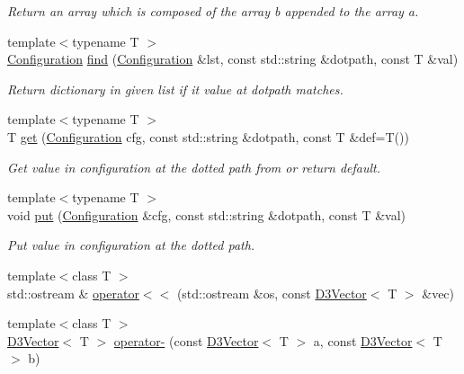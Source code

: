 \begin{DoxyCompactItemize}
\begin{DoxyCompactList}\small\item\em Return an array which is composed of the array b appended to the array a. \end{DoxyCompactList}\item 
{\footnotesize template$<$typename T $>$ }\\\hyperlink{namespace_wire_cell_a9f705541fc1d46c608b3d32c182333ee}{Configuration} \hyperlink{namespace_wire_cell_aeda39bc129b6bab40d0e35ffb4af55ef}{find} (\hyperlink{namespace_wire_cell_a9f705541fc1d46c608b3d32c182333ee}{Configuration} \&lst, const std\+::string \&dotpath, const T \&val)
\begin{DoxyCompactList}\small\item\em Return dictionary in given list if it value at dotpath matches. \end{DoxyCompactList}\item 
{\footnotesize template$<$typename T $>$ }\\T \hyperlink{namespace_wire_cell_addd60cc21dab98058698afa8222239bc}{get} (\hyperlink{namespace_wire_cell_a9f705541fc1d46c608b3d32c182333ee}{Configuration} cfg, const std\+::string \&dotpath, const T \&def=T())
\begin{DoxyCompactList}\small\item\em Get value in configuration at the dotted path from or return default. \end{DoxyCompactList}\item 
{\footnotesize template$<$typename T $>$ }\\void \hyperlink{namespace_wire_cell_a86bf5b387104e6d8db8e9b8fa2d09e9c}{put} (\hyperlink{namespace_wire_cell_a9f705541fc1d46c608b3d32c182333ee}{Configuration} \&cfg, const std\+::string \&dotpath, const T \&val)
\begin{DoxyCompactList}\small\item\em Put value in configuration at the dotted path. \end{DoxyCompactList}\item 
{\footnotesize template$<$class T $>$ }\\std\+::ostream \& \hyperlink{namespace_wire_cell_a041c350d5405d74eac84afa71983b3b8}{operator$<$$<$} (std\+::ostream \&os, const \hyperlink{class_wire_cell_1_1_d3_vector}{D3\+Vector}$<$ T $>$ \&vec)
\item 
{\footnotesize template$<$class T $>$ }\\\hyperlink{class_wire_cell_1_1_d3_vector}{D3\+Vector}$<$ T $>$ \hyperlink{namespace_wire_cell_a2fcfbe1421246fe979a5adfd4e7ee96a}{operator-\/} (const \hyperlink{class_wire_cell_1_1_d3_vector}{D3\+Vector}$<$ T $>$ a, const \hyperlink{class_wire_cell_1_1_d3_vector}{D3\+Vector}$<$ T $>$ b)

\end{DoxyCompactItemize}
